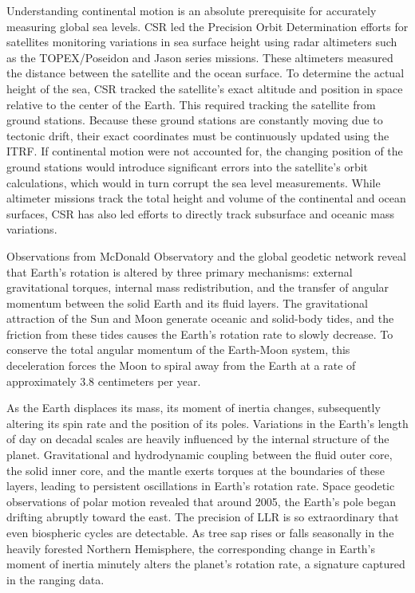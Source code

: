 Understanding continental motion is an absolute prerequisite for accurately measuring global sea levels. CSR led the Precision Orbit Determination efforts for satellites monitoring variations in sea surface height using radar altimeters such as the TOPEX/Poseidon and Jason series missions. These altimeters measured the distance between the satellite and the ocean surface. To determine the actual height of the sea, CSR tracked the satellite's exact altitude and position in space relative to the center of the Earth. This required tracking the satellite from ground stations. Because these ground stations are constantly moving due to tectonic drift, their exact coordinates must be continuously updated using the ITRF. If continental motion were not accounted for, the changing position of the ground stations would introduce significant errors into the satellite's orbit calculations, which would in turn corrupt the sea level measurements. While altimeter missions track the total height and volume of the continental and ocean surfaces, CSR has also led efforts to directly track subsurface and oceanic mass variations.

Observations from McDonald Observatory and the global geodetic network reveal that Earth's rotation is altered by three primary mechanisms: external gravitational torques, internal mass redistribution, and the transfer of angular momentum between the solid Earth and its fluid layers. The gravitational attraction of the Sun and Moon generate oceanic and solid-body tides, and the friction from these tides causes the Earth's rotation rate to slowly decrease. To conserve the total angular momentum of the Earth-Moon system, this deceleration forces the Moon to spiral away from the Earth at a rate of approximately 3.8 centimeters per year.

As the Earth displaces its mass, its moment of inertia changes, subsequently altering its spin rate and the position of its poles. Variations in the Earth's length of day on decadal scales are heavily influenced by the internal structure of the planet. Gravitational and hydrodynamic coupling between the fluid outer core, the solid inner core, and the mantle exerts torques at the boundaries of these layers, leading to persistent oscillations in Earth's rotation rate. Space geodetic observations of polar motion revealed that around 2005, the Earth's pole began drifting abruptly toward the east. The precision of LLR is so extraordinary that even biospheric cycles are detectable. As tree sap rises or falls seasonally in the heavily forested Northern Hemisphere, the corresponding change in Earth's moment of inertia minutely alters the planet's rotation rate, a signature captured in the ranging data.

